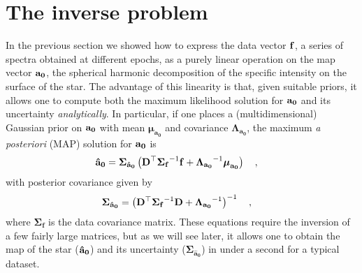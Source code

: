 \documentclass[modern]{aastex631}
\begin{document}
\section{The inverse problem}
\label{sec:inverse}
%
In the previous section we showed how to express the data vector ${\mathbf{f}}$, a series of spectra obtained at different epochs, as a purely linear operation on the map vector ${\mathbf{a_0}}$, the spherical harmonic decomposition of the specific intensity on the surface of the star. 
The advantage of this linearity is that, given suitable priors, it allows one to compute both the maximum likelihood solution for ${\mathbf{a_0}}$ and its uncertainty \emph{analytically}. 
In particular, if one places a (multidimensional) Gaussian prior on ${\mathbf{a_0}}$ with mean $\boldsymbol{\mu}_\mathbf{a_0}$ and covariance $\boldsymbol{\Lambda}_\mathbf{a_0}$, the maximum \emph{a posteriori} (MAP)
solution for ${\mathbf{a_0}}$ is
%
\begin{align}
    \label{eq:inverse:ahat}
    {\ensuremath{\mathbf{\hat{a}_0}}} & =
    \boldsymbol{\Sigma}_\mathbf{\hat{a}_0}
    \left(
    {\mathbf{D}}^\top
    {\boldsymbol{\Sigma}_\mathbf{f}}^{-1}
    {\mathbf{f}}
    +
    {\boldsymbol{\Lambda}_{{\mathbf{a_0}}}}^{-1} \boldsymbol{\mu}_\mathbf{a_0}
    \right)
    \quad,
\end{align}
%
with posterior covariance given by
%
\begin{align}
    \label{eq:inverse:acov}
    \boldsymbol{\Sigma}_\mathbf{\hat{a}_0} & =
    \left(
    {\mathbf{D}}^\top
    {\boldsymbol{\Sigma}_\mathbf{f}}^{-1}
    {\mathbf{D}}
    +
    {\boldsymbol{\Lambda}_{{\mathbf{a_0}}}}^{-1}
    \right)^{-1}
    \quad,
\end{align}
%
where $\boldsymbol{\Sigma}_\mathbf{f}$ is the data covariance matrix. 
These equations require the inversion of a few fairly large matrices, but as we will see later, it allows one to obtain the map of the star (${\mathbf{\hat{a}_0}}$) and its uncertainty ($\boldsymbol{\Sigma}_{\mathbf{\hat{a}_0}}$) in under a second for a typical dataset.
\end{document}
